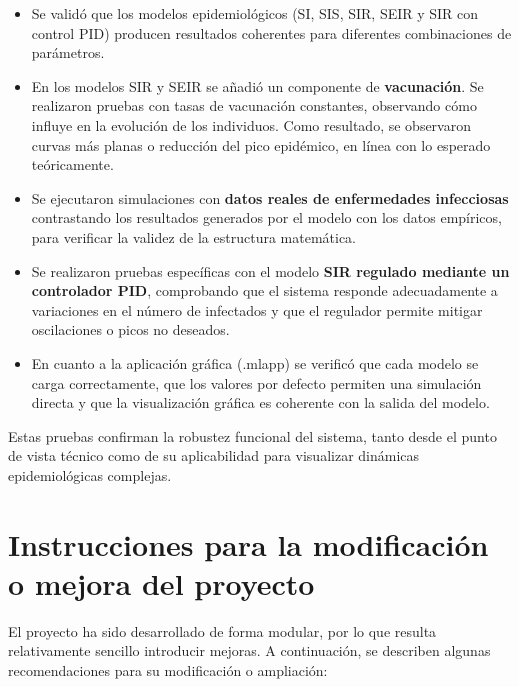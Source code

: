 \begin{itemize}
    \item Se validó que los modelos epidemiológicos (SI, SIS, SIR, SEIR y SIR con control PID) producen resultados coherentes para diferentes combinaciones de parámetros.

    \item En los modelos SIR y SEIR se añadió un componente de \textbf{vacunación}. Se realizaron pruebas con tasas de vacunación constantes, observando cómo influye en la evolución de los individuos. Como resultado, se observaron curvas más planas o reducción del pico epidémico, en línea con lo esperado teóricamente.

    \item Se ejecutaron simulaciones con \textbf{datos reales de enfermedades infecciosas} contrastando los resultados generados por el modelo con los datos empíricos, para verificar la validez de la estructura matemática.

    \item Se realizaron pruebas específicas con el modelo \textbf{SIR regulado mediante un controlador PID}, comprobando que el sistema responde adecuadamente a variaciones en el número de infectados y que el regulador permite mitigar oscilaciones o picos no deseados.

    \item En cuanto a la aplicación gráfica (.mlapp) se verificó que cada modelo se carga correctamente, que los valores por defecto permiten una simulación directa y que la visualización gráfica es coherente con la salida del modelo.

    
\end{itemize}

Estas pruebas confirman la robustez funcional del sistema, tanto desde el punto de vista técnico como de su aplicabilidad para visualizar dinámicas epidemiológicas complejas.

\section{Instrucciones para la modificación o mejora del proyecto}

El proyecto ha sido desarrollado de forma modular, por lo que resulta relativamente sencillo introducir mejoras. A continuación, se describen algunas recomendaciones para su modificación o ampliación:

